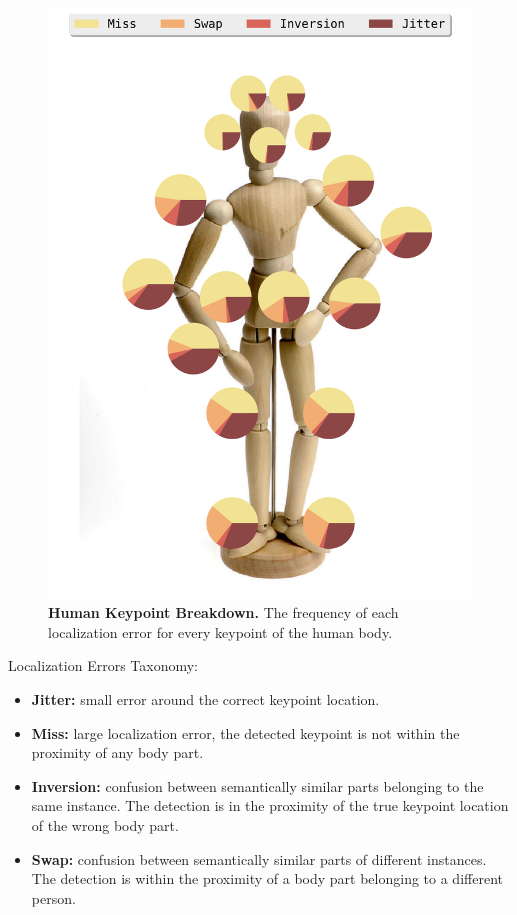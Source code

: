 \documentclass[10pt,onecolumn,letterpaper]{article}
\begin{document}
\begin{figure}
\includegraphics[width=\linewidth]{./result/rmpe/localization_errors/keypoints_breakdown/keypoint_breakdown.pdf}
\caption{ {\small \textbf{Human Keypoint Breakdown.} The frequency of each localization error for every keypoint of the human body.}}
\end{figure}

Localization Errors Taxonomy:
\begin{itemize}
\item \textbf{Jitter:} small error around the correct keypoint location.

\item \textbf{Miss:} large localization error, the detected keypoint is not within the proximity of any body part.

\item \textbf{Inversion:} confusion between semantically similar parts belonging to the same instance. The detection is in the proximity of the true keypoint location of the wrong body part.

\item \textbf{Swap:} confusion between semantically similar parts of different instances. The detection is within the proximity of a body part belonging to a different person.

\end{itemize}
\end{document}
